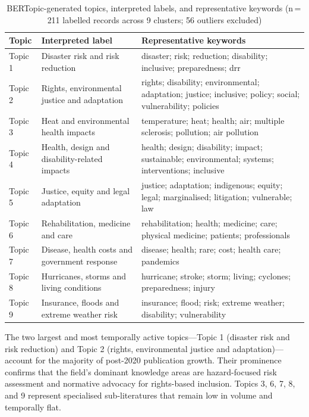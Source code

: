 \documentclass[12pt,a4paper]{article}
\begin{document}
\begin{table}[H]
\centering
\small
\renewcommand{\arraystretch}{1.3}
\caption{BERTopic-generated topics, interpreted labels, and representative keywords (n\,=\,211 labelled records across 9 clusters; 56 outliers excluded)}
\label{tab:bertopic_topics}
\begin{tabularx}{\textwidth}{
>{\raggedright\arraybackslash}p{}
>{\raggedright\arraybackslash}p{}
>{\raggedright\arraybackslash}X
}
\toprule
\textbf{Topic} & \textbf{Interpreted label} & \textbf{Representative keywords} \\
\midrule
Topic 1 & Disaster risk and risk reduction & disaster; risk; reduction; disability; inclusive; preparedness; drr \\
Topic 2 & Rights, environmental justice and adaptation & rights; disability; environmental; adaptation; justice; inclusive; policy; social; vulnerability; policies \\
Topic 3 & Heat and environmental health impacts & temperature; heat; health; air; multiple sclerosis; pollution; air pollution \\
Topic 4 & Health, design and disability-related impacts & health; design; disability; impact; sustainable; environmental; systems; interventions; inclusive \\
Topic 5 & Justice, equity and legal adaptation & justice; adaptation; indigenous; equity; legal; marginalised; litigation; vulnerable; law \\
Topic 6 & Rehabilitation, medicine and care & rehabilitation; health; medicine; care; physical medicine; patients; professionals \\
Topic 7 & Disease, health costs and government response & disease; health; rare; cost; health care; pandemics \\
Topic 8 & Hurricanes, storms and living conditions & hurricane; stroke; storm; living; cyclones; preparedness; injury \\
Topic 9 & Insurance, floods and extreme weather risk & insurance; flood; risk; extreme weather; disability; vulnerability \\
\bottomrule
\end{tabularx}
\end{table}

The two largest and most temporally active topics---Topic 1 (disaster risk and risk reduction) and Topic 2 (rights, environmental justice and adaptation)---account for the majority of post-2020 publication growth. Their prominence confirms that the field's dominant knowledge areas are hazard-focused risk assessment and normative advocacy for rights-based inclusion. Topics 3, 6, 7, 8, and 9 represent specialised sub-literatures that remain low in volume and temporally flat.
\end{document}
